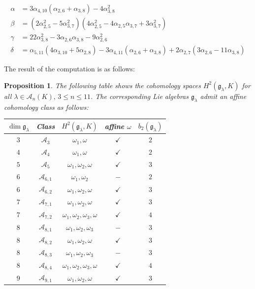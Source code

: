 \documentclass[12pt]{amsart}
\newtheorem{prop}[thm]{Proposition}
\theoremstyle{definition}
\theoremstyle{remark}
\newcommand{\Lg}{\mathfrak{g}}
\newcommand{\CA}{\mathcal{A}}
\newcommand{\mi}{\boldsymbol{-}}
\newcommand{\al}{\alpha}
\newcommand{\be}{\beta}
\newcommand{\ga}{\gamma}
\newcommand{\de}{\delta}
\newcommand{\la}{\lambda}
\newcommand{\om}{\omega}
\begin{document}
\begin{align*}
\al & = 3\al_{4,10}(\al_{2,6}+\al_{3,8})-4\al_{3,8}^2 \\
\be & =(2\al_{2,5}^2-5\al_{3,7}^2)(4\al_{2,5}^2-4\al_{2,5}\al_{3,7}+3\al_{3,7}^2)\\
\ga & = 22\al_{3,8}^2-3\al_{2,6}\al_{3,8}-9\al_{2,6}^2 \\
\de & = \al_{5,11}(4\al_{3,10}+5\al_{2,8})-3\al_{4,11}(\al_{2,6}+\al_{3,8})+
2\al_{2,7}(3\al_{2,6}-11\al_{3,8})
\end{align*}



The result of the computation is as follows:\\

\begin{prop}
The following table shows the cohomology
spaces $H^2(\Lg_{\la},K)$ for all $\la\in \CA_n(K),\, 3\le n\le 11$. 
The corresponding Lie algebras $\Lg_{\la}$ 
admit an affine cohomology class as follows:\\[0.5cm]
\hspace*{1.8cm}
\begin{tabular}{|c|c|c|c|c|}
\hline
$\dim \Lg_{\la}$ & Class & $H^2(\Lg_{\la},K)$  & affine $\om$ & $b_2(\Lg_{\la})$ \\
\hline\hline
$3$ & $\CA_3$     & $\om_1,\om$       & $\checkmark$   & $2$ \\ \hline 
$4$ & $\CA_4$     & $\om_1,\om$       & $\checkmark$   & $2$ \\ \hline
$5$ & $\CA_5$     & $\om_1,\om_2,\om$ & $\checkmark$   & $3$ \\ \hline
$6$ & $\CA_{6,1}$ & $\om_1,\om_2$     & $\mi$          & $2$ \\ \hline
$6$ & $\CA_{6,2}$ & $\om_1,\om_2,\om$ & $\checkmark$   & $3$ \\ \hline
$7$ & $\CA_{7,1}$ & $\om_1,\om_2,\om$ & $\checkmark$   & $3$ \\ \hline
$7$ & $\CA_{7,2}$ & $\om_1,\om_2,\om_3,\om$ & $\checkmark$  & $4$ \\ \hline
$8$ & $\CA_{8,1}$ & $\om_1,\om_2,\om_3$     & $\mi$         & $3$ \\ \hline
$8$ & $\CA_{8,2}$ & $\om_1,\om_2,\om$ & $\checkmark$   & $3$ \\ \hline
$8$ & $\CA_{8,3}$  & $\om_1,\om_2,\om_3$ & $\mi$          & $3$ \\ \hline
$8$ & $\CA_{8,4}$  & $\om_1,\om_2,\om_3,\om$ & $\checkmark$ & $4$ \\ \hline
$9$ & $\CA_{9,1}$  & $\om_1,\om_2,\om$ & $\checkmark$   & $3$ \\ \hline

\end{tabular}
\end{prop}
\end{document}
